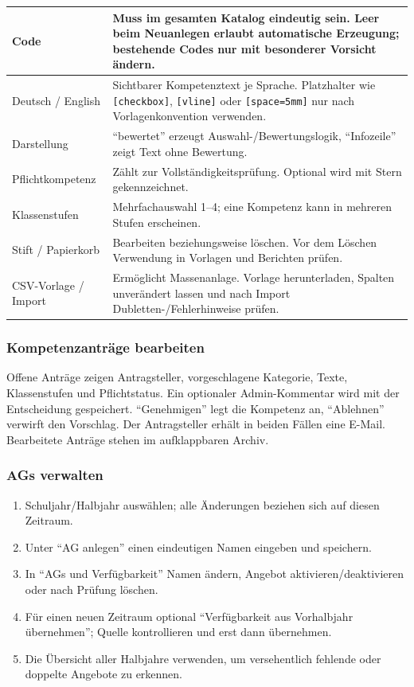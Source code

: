 \documentclass[12pt,a4paper]{article}
\begin{document}
\begin{tabularx}{\textwidth}{|p{}|X|}
\hline
Code & Muss im gesamten Katalog eindeutig sein. Leer beim Neuanlegen erlaubt automatische Erzeugung; bestehende Codes nur mit besonderer Vorsicht ändern.\\
\hline
Deutsch / English & Sichtbarer Kompetenztext je Sprache. Platzhalter wie \texttt{[checkbox]}, \texttt{[vline]} oder \texttt{[space=5mm]} nur nach Vorlagenkonvention verwenden.\\
\hline
Darstellung & \enquote{bewertet} erzeugt Auswahl-/Bewertungslogik, \enquote{Infozeile} zeigt Text ohne Bewertung.\\
\hline
Pflichtkompetenz & Zählt zur Vollständigkeitsprüfung. Optional wird mit Stern gekennzeichnet.\\
\hline
Klassenstufen & Mehrfachauswahl 1--4; eine Kompetenz kann in mehreren Stufen erscheinen.\\
\hline
Stift / Papierkorb & Bearbeiten beziehungsweise löschen. Vor dem Löschen Verwendung in Vorlagen und Berichten prüfen.\\
\hline
CSV-Vorlage / Import & Ermöglicht Massenanlage. Vorlage herunterladen, Spalten unverändert lassen und nach Import Dubletten-/Fehlerhinweise prüfen.\\
\hline
\end{tabularx}

\subsubsection{Kompetenzanträge bearbeiten}
Offene Anträge zeigen Antragsteller, vorgeschlagene Kategorie, Texte, Klassenstufen und Pflichtstatus. Ein optionaler Admin-Kommentar wird mit der Entscheidung gespeichert. \enquote{Genehmigen} legt die Kompetenz an, \enquote{Ablehnen} verwirft den Vorschlag. Der Antragsteller erhält in beiden Fällen eine E-Mail. Bearbeitete Anträge stehen im aufklappbaren Archiv.

\subsubsection{AGs verwalten}
\begin{enumerate}
  \item Schuljahr/Halbjahr auswählen; alle Änderungen beziehen sich auf diesen Zeitraum.
  \item Unter \enquote{AG anlegen} einen eindeutigen Namen eingeben und speichern.
  \item In \enquote{AGs und Verfügbarkeit} Namen ändern, Angebot aktivieren/deaktivieren oder nach Prüfung löschen.
  \item Für einen neuen Zeitraum optional \enquote{Verfügbarkeit aus Vorhalbjahr übernehmen}; Quelle kontrollieren und erst dann übernehmen.
  \item Die Übersicht aller Halbjahre verwenden, um versehentlich fehlende oder doppelte Angebote zu erkennen.
\end{enumerate}
\end{document}
